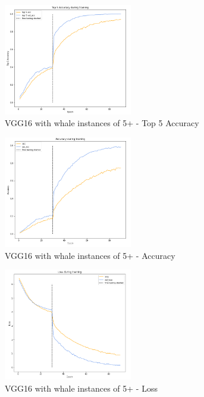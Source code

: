 \documentclass[paper=a4, fontsize=11pt]{scrartcl}
\numberwithin{equation}{section}		%
\numberwithin{table}{section}				%
\begin{document}
\begin{figure}[!h]
    \centering
    \includegraphics[width=0.5\textwidth]{TLtop5acc_big.png}
    \caption{VGG16 with whale instances of 5+ - Top 5 Accuracy}
    \label{fig:TLTOP5ACC5}
\end{figure}

\begin{figure}[!h]
    \centering
    \includegraphics[width=0.5\textwidth]{TLaccuracy_big.png}
    \caption{VGG16 with whale instances of 5+ - Accuracy}
    \label{fig:TLACC5}
\end{figure}

\begin{figure}[!h]
    \centering
    \includegraphics[width=0.5\textwidth]{TLloss_big.png}
    \caption{VGG16 with whale instances of 5+ - Loss}
    \label{fig:TLLOSS5}
\end{figure}
\end{document}
